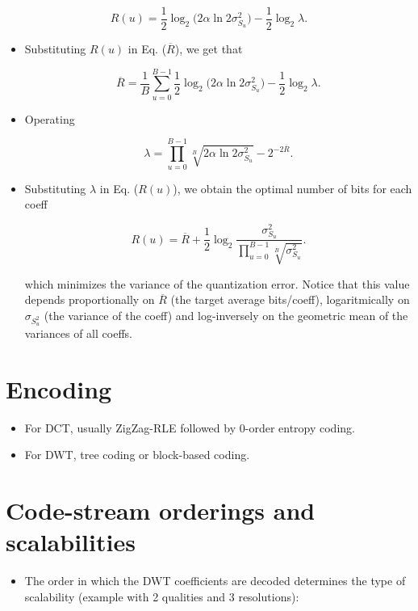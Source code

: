 \begin{equation}
    R(u) = \frac{1}{2}\log_2\big( 2\alpha\ln 2\sigma_{S_u}^2 \big) - \frac{1}{2}\log_2\lambda.
    \tag{$R(u)$}
  \end{equation}

\begin{itemize}
\item
  Substituting \(R(u)\) in Eq. (\(\overline{R}\)), we get that

  \begin{equation}
    \overline{R} = \frac{1}{B}\sum_{u=0}^{B-1}\frac{1}{2}\log_2\big( 2\alpha\ln 2\sigma_{S_u}^2 \big) - \frac{1}{2}\log_2\lambda.
  \end{equation}
\item
  Operating

  \begin{equation}
    \lambda = \prod_{u=0}^{B-1}\sqrt[B]{2\alpha\ln 2\sigma_{S_u}^2} - 2^{-2\overline{R}}.
  \end{equation}
\item
  Substituting \(\lambda\) in Eq. (\(R(u)\)), we obtain the optimal
  number of bits for each coeff

  \begin{equation}
    R(u) = \overline{R} + \frac{1}{2}\log_2\frac{\sigma_{S_u}^2}{\displaystyle\prod_{u=0}^{B-1}\sqrt[B]{\sigma_{S_u}^2}}.
  \end{equation}

  which minimizes the variance of the quantization error. Notice that
  this value depends proportionally on \(\overline{R}\) (the target
  average bits/coeff), logaritmically on \(\sigma_{S_u^2}\) (the
  variance of the coeff) and log-inversely on the geometric mean of the
  variances of all coeffs.
\end{itemize}

\section{Encoding}
\begin{itemize}
\tightlist
\item
  For DCT, usually ZigZag-RLE followed by 0-order entropy coding.
\item
  For DWT, tree coding or block-based coding.
\end{itemize}

\section{Code-stream orderings and scalabilities}
\begin{itemize}
\tightlist
\item
  The order in which the DWT coefficients are decoded determines the type of
  scalability (example with 2 qualities and 3 resolutions):
\end{itemize}



